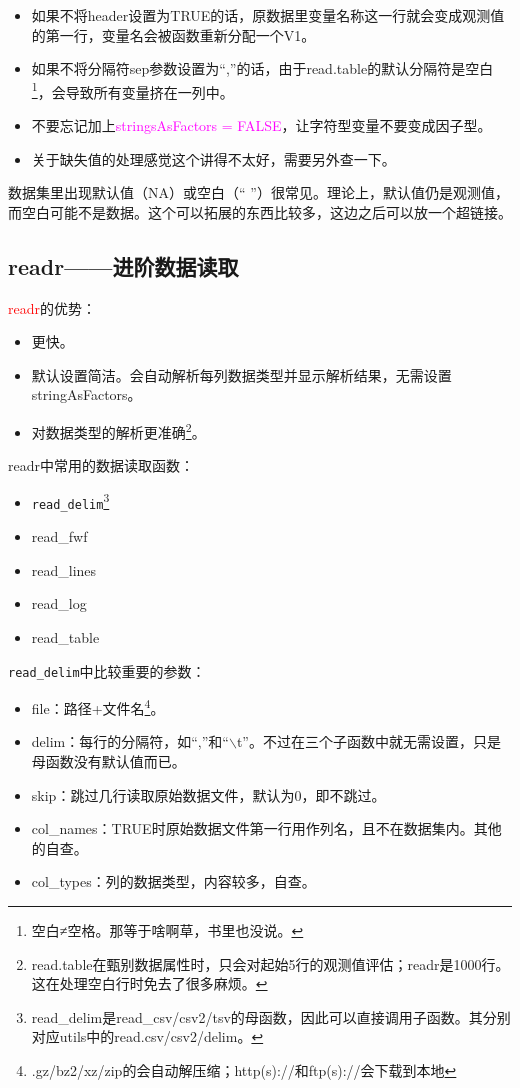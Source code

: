 \documentclass[cn,hazy,blue,14pt,screen]{elegantnote}
\begin{document}
\begin{itemize}
  \item 如果不将header设置为TRUE的话，原数据里变量名称这一行就会变成观测值的第一行，变量名会被函数重新分配一个V1。
  \item 如果不将分隔符sep参数设置为“,”的话，由于read.table的默认分隔符是空白\footnote{空白≠空格。那等于啥啊草，书里也没说。}，会导致所有变量挤在一列中。
  \item 不要忘记加上\textcolor{magenta}{stringsAsFactors = FALSE}，让字符型变量不要变成因子型。
  \item 关于缺失值的处理感觉这个讲得不太好，需要另外查一下。
\end{itemize}

数据集里出现默认值（NA）或空白（“ ”）很常见。理论上，默认值仍是观测值，而空白可能不是数据。这个可以拓展的东西比较多，这边之后可以放一个超链接。

\subsection{readr——进阶数据读取}
\textcolor{red}{readr}的优势：

\begin{itemize}
  \item 更快。
  \item 默认设置简洁。会自动解析每列数据类型并显示解析结果，无需设置stringAsFactors。
  \item 对数据类型的解析更准确\footnote{read.table在甄别数据属性时，只会对起始5行的观测值评估；readr是1000行。这在处理空白行时免去了很多麻烦。}。
\end{itemize}

readr中常用的数据读取函数：

\begin{itemize}
  \item \lstinline{read_delim}\footnote{read\_delim是read\_csv/csv2/tsv的母函数，因此可以直接调用子函数。其分别对应utils中的read.csv/csv2/delim。}
  \item read\_fwf
  \item read\_lines
  \item read\_log
  \item read\_table
\end{itemize}

\lstinline{read_delim}中比较重要的参数：

\begin{itemize}
  \item file：路径+文件名\footnote{.gz/bz2/xz/zip的会自动解压缩；http(s)://和ftp(s)://会下载到本地}。
  \item delim：每行的分隔符，如“,”和“$\backslash$t”。不过在三个子函数中就无需设置，只是母函数没有默认值而已。
  \item skip：跳过几行读取原始数据文件，默认为0，即不跳过。
  \item col\_names：TRUE时原始数据文件第一行用作列名，且不在数据集内。其他的自查。
  \item col\_types：列的数据类型，内容较多，自查。
\end{itemize}
\end{document}
